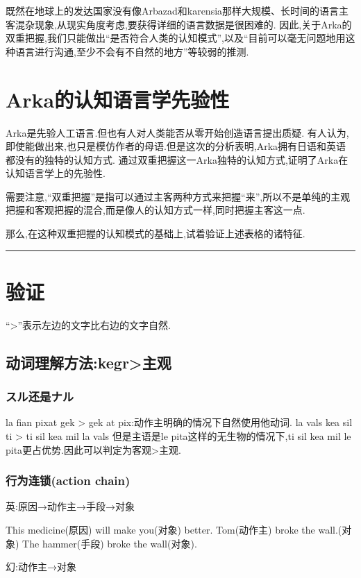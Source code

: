 既然在地球上的发达国家没有像Arbazad和karensia那样大规模、长时间的语言主客混杂现象,从现实角度考虑,要获得详细的语言数据是很困难的.
因此,关于Arka的双重把握,我们只能做出``是否符合人类的认知模式'',以及``目前可以毫无问题地用这种语言进行沟通,至少不会有不自然的地方''等较弱的推测.

\section{Arka的认知语言学先验性}
Arka是先验人工语言.但也有人对人类能否从零开始创造语言提出质疑.
有人认为,即使能做出来,也只是模仿作者的母语.但是这次的分析表明,Arka拥有日语和英语都没有的独特的认知方式.
通过双重把握这一Arka独特的认知方式,证明了Arka在认知语言学上的先验性.

需要注意,``双重把握''是指可以通过主客两种方式来把握``来'',所以不是单纯的主观把握和客观把握的混合,而是像人的认知方式一样,同时把握主客这一点.

那么,在这种双重把握的认知模式的基础上,试着验证上述表格的诸特征.

{\noindent} \rule[-10pt]{17.5cm}{0.05em}
\section{验证}

``>''表示左边的文字比右边的文字自然.

\subsection{动词理解方法:kegr>主观}

\subsubsection{スル还是ナル}

la fian pixat gek > gek at pix:动作主明确的情况下自然使用他动词.
la vals kea sil ti > ti sil kea mil la vals
但是主语是le pita这样的无生物的情况下,ti sil kea mil le pita更占优势.因此可以判定为客观>主观.

\subsubsection{行为连锁(action chain)}

英:原因→动作主→手段→对象

This medicine(原因) will make you(对象) better.
Tom(动作主) broke the wall.(对象)
The hammer(手段) broke the wall(对象).

幻:动作主→对象

